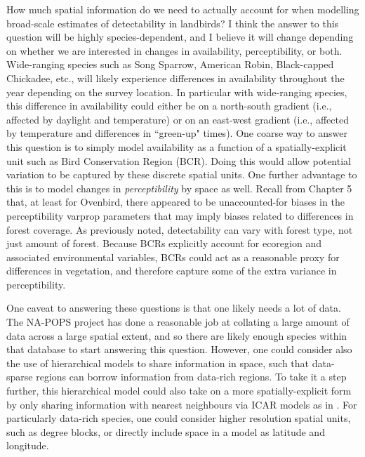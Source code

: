 \par How much spatial information do we need to actually account for when modelling broad-scale estimates of detectability in landbirds?
I think the answer to this question will be highly species-dependent, and I believe it will change depending on whether we are interested in changes in availability, perceptibility, or both.
Wide-ranging species such as Song Sparrow, American Robin, Black-capped Chickadee, etc., will likely experience differences in availability throughout the year depending on the survey location.
In particular with wide-ranging species, this difference in availability could either be on a north-south gradient (i.e., affected by daylight and temperature) or on an east-west gradient (i.e., affected by temperature and differences in ``green-up" times).
One coarse way to answer this question is to simply model availability as a function of a spatially-explicit unit such as Bird Conservation Region (BCR).
Doing this would allow potential variation to be captured by these discrete spatial units.
One further advantage to this is to model changes in \textit{perceptibility} by space as well.
Recall from Chapter 5 that, at least for Ovenbird, there appeared to be unaccounted-for biases in the perceptibility varprop parameters that may imply biases related to differences in forest coverage.
As previously noted, detectability can vary with forest type, not just amount of forest.
Because BCRs explicitly account for ecoregion and associated environmental variables, BCRs could act as a reasonable proxy for differences in vegetation, and therefore capture some of the extra variance in perceptibility.

\par One caveat to answering these questions is that one likely needs a lot of data.
The NA-POPS project has done a reasonable job at collating a large amount of data across a large spatial extent, and so there are likely enough species within that database to start answering this question.
However, one could consider also the use of hierarchical models to share information in space, such that data-sparse regions can borrow information from data-rich regions.
To take it a step further, this hierarchical model could also take on a more spatially-explicit form by only sharing information with nearest neighbours via ICAR models as in \citet{smith_spatially_2023}.
For particularly data-rich species, one could consider higher resolution spatial units, such as degree blocks, or directly include space in a model as latitude and longitude.

